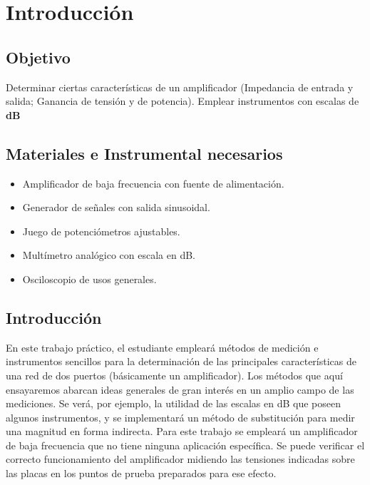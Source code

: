 \chapter{Introducción}
\section{Objetivo}
Determinar ciertas características de un amplificador (Impedancia de entrada y salida; Ganancia de tensión y de potencia). Emplear instrumentos con escalas de \textbf{dB}

\section{Materiales e Instrumental necesarios}
\begin{itemize}
	\item Amplificador de baja frecuencia con fuente de alimentación.
	\item Generador de señales con salida sinusoidal.
	\item Juego de potenciómetros ajustables.
	\item Multímetro analógico con escala en dB.
	\item Osciloscopio de usos generales.
\end{itemize}

\section{Introducción}
En este trabajo práctico, el estudiante empleará métodos de medición e instrumentos sencillos para la determinación de las principales características de una red de dos puertos (básicamente un amplificador).  Los métodos  que aquí ensayaremos abarcan ideas generales de gran interés en un amplio campo de las mediciones. Se verá,  por ejemplo, la utilidad de las escalas en dB que poseen algunos instrumentos, y se implementará un método de substitución para medir una
magnitud en forma indirecta.
Para este trabajo se empleará un amplificador de baja frecuencia  que no tiene ninguna aplicación específica.
Se puede verificar el correcto funcionamiento  del amplificador midiendo las tensiones indicadas sobre las placas en los puntos de prueba preparados para ese efecto.
